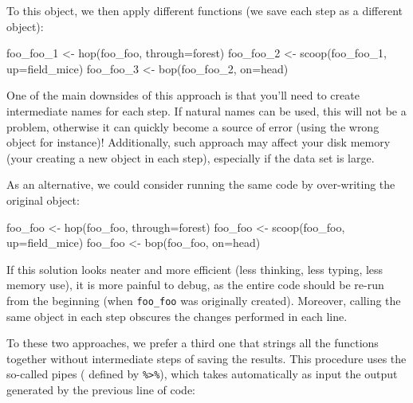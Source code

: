 \documentclass[
]{book}
\newenvironment{Shaded}{\begin{snugshade}}{\end{snugshade}}
\newcommand{\AttributeTok}[1]{\textcolor[rgb]{0.77,0.63,0.00}{#1}}
\newcommand{\FunctionTok}[1]{\textcolor[rgb]{0.00,0.00,0.00}{#1}}
\newcommand{\NormalTok}[1]{#1}
\newcommand{\OtherTok}[1]{\textcolor[rgb]{0.56,0.35,0.01}{#1}}
\begin{document}
To this object, we then apply different functions (we save each step as a different object):

\begin{Shaded}
\begin{Highlighting}[]
\NormalTok{foo\_foo\_1 }\OtherTok{\textless{}{-}} \FunctionTok{hop}\NormalTok{(foo\_foo, }\AttributeTok{through=}\NormalTok{forest)}
\NormalTok{foo\_foo\_2 }\OtherTok{\textless{}{-}} \FunctionTok{scoop}\NormalTok{(foo\_foo\_1, }\AttributeTok{up=}\NormalTok{field\_mice)}
\NormalTok{foo\_foo\_3 }\OtherTok{\textless{}{-}} \FunctionTok{bop}\NormalTok{(foo\_foo\_2, }\AttributeTok{on=}\NormalTok{head)}
\end{Highlighting}
\end{Shaded}

One of the main downsides of this approach is that you'll need to create intermediate names for each step. If natural names can be used, this will not be a problem, otherwise it can quickly become a source of error (using the wrong object for instance)! Additionally, such approach may affect your disk memory (your creating a new object in each step), especially if the data set is large.

As an alternative, we could consider running the same code by over-writing the original object:

\begin{Shaded}
\begin{Highlighting}[]
\NormalTok{foo\_foo }\OtherTok{\textless{}{-}} \FunctionTok{hop}\NormalTok{(foo\_foo, }\AttributeTok{through=}\NormalTok{forest)}
\NormalTok{foo\_foo }\OtherTok{\textless{}{-}} \FunctionTok{scoop}\NormalTok{(foo\_foo, }\AttributeTok{up=}\NormalTok{field\_mice)}
\NormalTok{foo\_foo }\OtherTok{\textless{}{-}} \FunctionTok{bop}\NormalTok{(foo\_foo, }\AttributeTok{on=}\NormalTok{head)}
\end{Highlighting}
\end{Shaded}

If this solution looks neater and more efficient (less thinking, less typing, less memory use), it is more painful to debug, as the entire code should be re-run from the beginning (when \texttt{foo\_foo} was originally created). Moreover, calling the same object in each step obscures the changes performed in each line.

To these two approaches, we prefer a third one that strings all the functions together without intermediate steps of saving the results. This procedure uses the so-called pipes ( defined by \texttt{\%\textgreater{}\%}), which takes automatically as input the output generated by the previous line of code:
\end{document}
